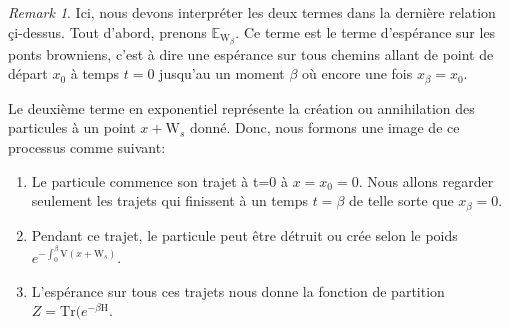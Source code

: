 \documentclass[11pt]{article}
\theoremstyle{definition}
\theoremstyle{remark}
\newtheorem*{remark}{Remark}
\begin{document}
\begin{remark}
Ici, nous devons interpréter les deux termes dans la dernière relation çi-dessus. Tout d'abord, prenons $\mathbb{E}_{\mathrm{W}_{\beta}}$. Ce terme est le terme d’espérance sur les ponts browniens, c'est à dire une espérance sur tous chemins allant de point de départ $x_0$ à temps $t=0$ jusqu'au un moment $\beta$ où encore une fois $x_{\beta}=x_0$. 

Le deuxième terme en exponentiel représente la création ou annihilation des particules à un point $x+\mathrm{W}_{s}$ donné. Donc, nous formons une image de ce processus comme suivant: 

\begin{enumerate} 

\item 

Le particule commence son trajet à t=0 à $x=x_0 = 0$. Nous allons regarder seulement les trajets qui finissent à un temps $t=\beta$ de telle sorte que $x_\beta = 0$.

\item 

Pendant ce trajet, le particule peut être détruit ou crée selon le poids $e^{-\int_{0}^{\beta} \mathrm{V}(x+\mathrm{W}_{s})}$. 

\item 

L’espérance sur tous ces trajets nous donne la fonction de partition $Z = \mathrm{Tr}(e^{-\beta \mathrm{H}}$. 
\end{enumerate}


\end{remark}
\end{document}
